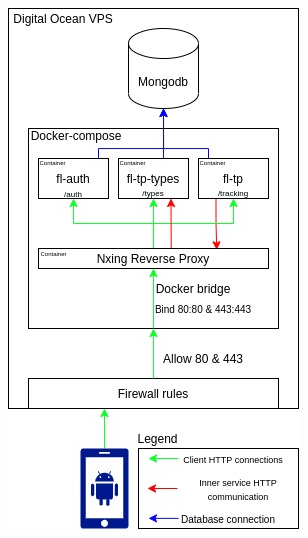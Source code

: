 \documentclass{article}
\newcommand{\vspaceconst}{-2ex}
\begin{document}
\begin{multicols}{2}
\begingroup
\centering
\includegraphics[width=0.7\linewidth]{./charts/fitness-logger.jpg}
~\label{fig:a}
\endgroup









\end{multicols}
\end{document}
